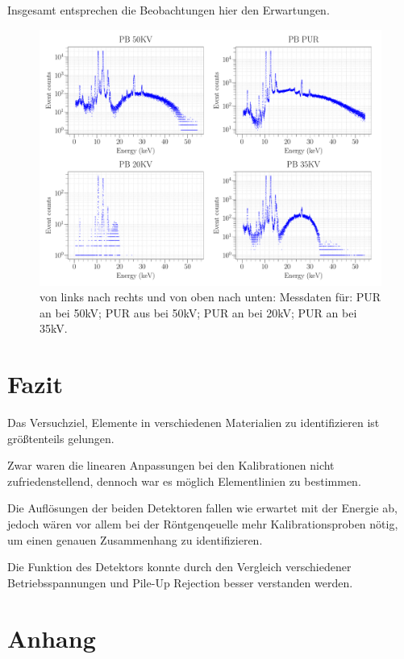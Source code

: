 \documentclass[a4paper,14pt]{article}
\begin{document}
Insgesamt entsprechen die Beobachtungen hier den Erwartungen.

\begin{figure}[H]
\centering
\includegraphics[scale=0.25]{../Figures/XRay-comparison.pdf}
\caption{von links nach rechts und von oben nach unten: Messdaten für: PUR an bei 50kV; PUR aus bei 50kV; PUR an bei 20kV; PUR an bei 35kV.}
\label{XRay-comparison}
\end{figure}


\section{Fazit}
Das Versuchziel, Elemente in verschiedenen Materialien zu identifizieren ist größtenteils gelungen.

Zwar waren die linearen Anpassungen bei den Kalibrationen nicht zufriedenstellend, dennoch war es möglich Elementlinien zu bestimmen. 

Die Auflösungen der beiden Detektoren fallen wie erwartet mit der Energie ab, jedoch wären vor allem bei der Röntgenqeuelle mehr Kalibrationsproben nötig, um einen genauen Zusammenhang zu identifizieren.

Die Funktion des Detektors konnte durch den Vergleich verschiedener Betriebsspannungen und Pile-Up Rejection besser verstanden werden.





\section{Anhang}
\end{document}
